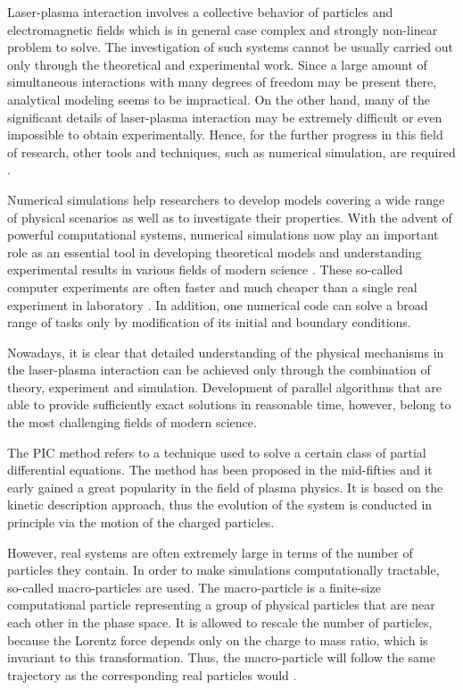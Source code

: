 Laser-plasma interaction involves a collective behavior of particles and electromagnetic fields which is in general case complex and strongly non-linear problem to solve. The investigation of such systems cannot be usually carried out only through the theoretical and experimental work. Since a large amount of simultaneous interactions with many degrees of freedom may be present there, analytical modeling seems to be impractical. On the other hand, many of the significant details of laser-plasma interaction may be extremely difficult or even impossible to obtain experimentally. Hence, for the further progress in this field of research, other tools and techniques, such as numerical simulation, are required \cite{jaroszynsky}.

Numerical simulations help researchers to develop models covering a wide range of physical scenarios as well as to investigate their properties. With the advent of powerful computational systems, numerical simulations now play an important role as an essential tool in developing theoretical models and understanding experimental results in various fields of modern science \cite{pang}. These so-called computer experiments are often faster and much cheaper than a single real experiment in laboratory \cite{gould}. In addition, one numerical code can solve a broad range of tasks only by modification of its initial and boundary conditions.

Nowadays, it is clear that detailed understanding of the physical mechanisms in the laser-plasma interaction can be achieved only through the combination of theory, experiment and simulation. Development of parallel algorithms that are able to provide sufficiently exact solutions in reasonable time, however, belong to the most challenging fields of modern science.

The PIC method refers to a technique used to solve a certain class of partial differential equations. The method has been proposed in the mid-fifties and it early gained a great popularity in the field of plasma physics. It is based on the kinetic description approach, thus the evolution of the system is conducted in principle via the motion of the charged particles.

However, real systems are often extremely large in terms of the number of particles they contain. In order to make simulations computationally tractable, so-called macro-particles are used. The macro-particle is a finite-size computational particle representing a group of physical particles that are near each other in the phase space. It is allowed to rescale the number of particles, because the Lorentz force depends only on the charge to mass ratio, which is invariant to this transformation. Thus, the macro-particle will follow the same trajectory as the corresponding real particles would \cite{hockney}.

